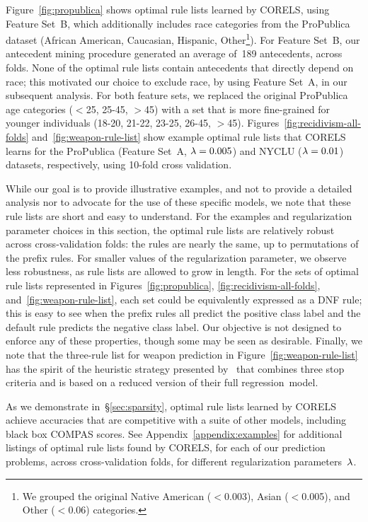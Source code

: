 Figure~\ref{fig:propublica} shows optimal rule lists learned by CORELS,
using Feature Set~B, which additionally includes race categories from the ProPublica dataset (African American, Caucasian, Hispanic,
Other\footnote{We grouped the original Native American ($<$0.003), Asian ($<$0.005), and Other ($<$0.06) categories.}).
%
For Feature Set~B, our antecedent mining procedure generated an average
of~189 antecedents, across folds.
%
None of the optimal rule lists contain antecedents that directly depend on race;
this motivated our choice to exclude race, by using Feature Set~A, in our subsequent analysis.
%
For both feature sets, we replaced the original ProPublica age categories ($<$25, 25-45, $>$45)
with a set that is more fine-grained for younger individuals (18-20, 21-22, 23-25, 26-45, $>$45).
%
Figures~\ref{fig:recidivism-all-folds} and~\ref{fig:weapon-rule-list}
show example optimal rule lists that CORELS learns
for the ProPublica (Feature Set~A, ${{\lambda} = 0.005}$) and NYCLU (${{\lambda} = 0.01}$) datasets, respectively,
using 10-fold cross validation.

While our goal is to provide illustrative examples, and not to provide a
detailed analysis nor to advocate for the use of these specific models,
we note that these rule lists are short and easy to understand.
%
For the examples and regularization parameter choices in this section,
the optimal rule lists are relatively robust across cross-validation folds:
the rules are nearly the same, up to permutations of the prefix rules.
%
For smaller values of the regularization parameter, we observe less robustness,
as rule lists are allowed to grow in length.
%
For the sets of optimal rule lists represented in Figures~\ref{fig:propublica},
\ref{fig:recidivism-all-folds}, and~\ref{fig:weapon-rule-list},
each set could be equivalently expressed as a DNF rule;
\eg this is easy to see when the prefix rules all predict the positive class label
and the default rule predicts the negative class label.
%
Our objective is not designed to enforce any of these properties,
though some may be seen as desirable.
%
Finally, we note that the three-rule list for weapon prediction
in Figure~\ref{fig:weapon-rule-list} has the spirit of the heuristic
strategy presented by~\citet{Goel16} that combines three stop criteria
and is based on a reduced version of their full regression~model.

As we demonstrate in~\S\ref{sec:sparsity},
optimal rule lists learned by CORELS achieve accuracies that are competitive
with a suite of other models, including black box COMPAS scores.
%
See Appendix~\ref{appendix:examples} for additional listings of optimal rule lists found
by CORELS, for each of our prediction problems, across cross-validation folds,
for different regularization parameters~${\lambda}$.

